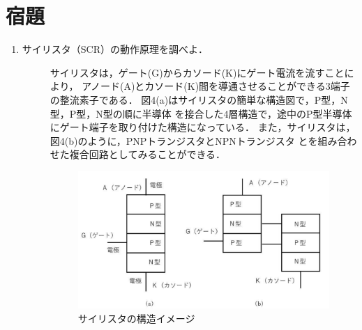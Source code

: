 
\section{宿題}

\begin{enumerate}
    \item サイリスタ（SCR）の動作原理を調べよ．
    \begin{description}
        \item[] サイリスタは，ゲート(G)からカソード(K)にゲート電流を流すことにより，
        アノード(A)とカソード(K)間を導通させることができる3端子の整流素子である．
        図4(a)はサイリスタの簡単な構造図で，P型，N型，P型，N型の順に半導体
        を接合した4層構造で，途中のP型半導体にゲート端子を取り付けた構造になっている．
        また，サイリスタは，図4(b)のように，PNPトランジスタとNPNトランジスタ
        とを組み合わせた複合回路としてみることができる．
        \begin{figure}[H]
            \begin{center}
                \includegraphics[scale=0.5]{figure4.pdf}
                \caption{サイリスタの構造イメージ}
            \end{center}
        \end{figure}


\end{description}
\end{enumerate}
